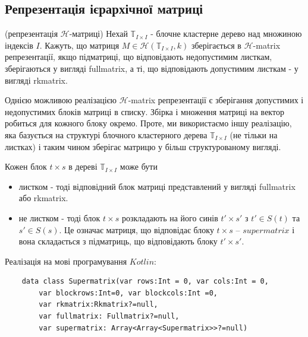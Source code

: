 \documentclass[12pt]{report}
\begin{document}
	\subsection{Репрезентація ієрархічної матриці}
	\begin{Def}
		(репрезентація $\mathcal{H}$-матриці)  Нехай $\mathbb{T}_{I\times I}$ - блочне кластерне дерево над множиною індексів $I$. Кажуть, що матриця $M\in\mathcal{H}(\mathbb{T}_{I\times I},k)$ зберігається в $\mathcal{H}$-matrix репрезентації, якщо підматриці, що відповідають недопустимим листкам, зберігаються у вигляді fullmatrix, а ті, що відповідають допустимим листкам - у вигляді rkmatrix. 
	\end{Def}
	\par Однією можливою реалізацією $\mathcal{H}$-matrix репрезентації є зберігання допустимих і недопустимих блоків матриці в списку. Збірка і множення матриці на вектор робиться для кожного блоку окремо. Проте, ми використаємо іншу реалізацію, яка базується на структурі блочного кластерного дерева $\mathbb{T}_{I\times I}$ (не тільки на листках) і таким чином зберігає матрицю у більш структурованому вигляді.
	\par Кожен блок $t\times s$ в дереві $\mathbb{T}_{I\times I}$ може бути 
	\begin{itemize}
		\item листком - тоді відповідний блок матриці представлений у вигляді fullmatrix або rkmatrix.
		\item не листком - тоді блок $t\times s$ розкладають на його синів $t'\times s'$ з $t'\in S(t)$ та $s' \in S(s)$. Це означає матриця, що відповідає блоку $t\times s$ -- $supermatrix$ і вона складається з підматриць, що відповідають блоку $t'\times s'$.
	\end{itemize} 
	\par Реалізація на мові програмування $Kotlin$:
	\begin{verbatim}
	data class Supermatrix(var rows:Int = 0, var cols:Int = 0,
	    var blockrows:Int=0, var blockcols:Int =0,
	    var rkmatrix:Rkmatrix?=null,
	    var fullmatrix: Fullmatrix?=null, 
	    var supermatrix: Array<Array<Supermatrix>>?=null)
	
	\end{verbatim}
\end{document}
